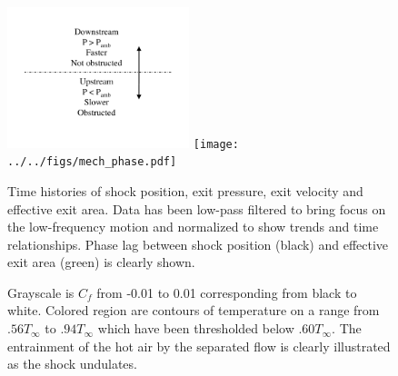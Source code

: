 \documentclass[]{aiaa-tc}%
\begin{document}
\begin{figure}[!h]%
	\begin{center}
	\includegraphics[trim = 3in 0in 2in 0in, clip,width=2.085in]{figs/phase_key.pdf}
	\texttt{[image: ../../figs/mech\_phase.pdf]}
	\end{center}
 	\caption{Time histories of shock position, exit pressure, exit velocity and effective exit area.  Data has been low-pass filtered to bring focus on the low-frequency motion and normalized to show trends and time relationships.  Phase lag between shock position (black) and effective exit area (green) is clearly shown.   }
 	\label{fig:phase}
\end{figure}



\begin{figure}
  \centering
  
  \hspace{0.1in}	            
  \hspace{0.1in}	
  
  
  \hspace{0.1in}	            
  \hspace{0.1in}	
  
  
  \hspace{0.1in}	            
  \hspace{0.1in}	
  
  \caption{Grayscale is $C_f$ from -0.01 to 0.01 corresponding from black to white.  Colored region are contours of temperature on a range from $.56T_{\infty}$ to $.94T_{\infty}$ which have been thresholded below $.60T_{\infty}$.  The entrainment of the hot air by the separated flow is clearly illustrated as the shock undulates.  }
  
  \label{fig:whistory}
\end{figure}
\end{document}
